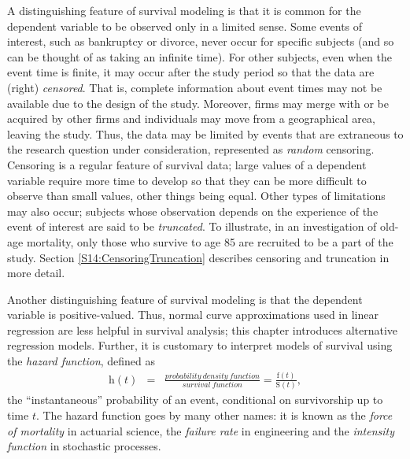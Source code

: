 
A distinguishing feature of survival modeling is that it is common
for the dependent variable to be observed only in a limited sense.
Some events of interest, such as bankruptcy or divorce, never occur
for specific subjects (and so can be thought of as taking an
infinite time). For other subjects, even when the event time is
finite, it may occur after the study period so that the data are
(right) \emph{censored}. That is, complete information about event
times may not be available due to the design of the study. Moreover,
firms may merge with or be acquired by other firms and individuals
may move from a geographical area, leaving the study. Thus, the data
may be limited by events that are extraneous to the research
question under consideration, represented as \emph{random}
censoring. Censoring is a regular feature of survival data; large
values of a dependent variable require more time to develop so that
they can be more difficult to observe than small values, other
things being equal. Other types of limitations may also occur;
subjects whose observation depends on the experience of the event of
interest are said to be \emph{truncated}. To illustrate, in an
investigation of old-age mortality, only those who survive to age 85
are recruited to be a part of the study. Section
\ref{S14:CensoringTruncation} describes censoring and truncation in
more detail.


Another distinguishing feature of survival modeling is that the
dependent variable is positive-valued. Thus, normal curve
approximations used in linear regression are less helpful in
survival analysis; this chapter introduces alternative regression
models. Further, it is customary to interpret models of survival
using the \emph{hazard function}, defined as
\begin{eqnarray*}
\mathrm{h}(t)&= &\frac{probability~density~function}
{survival~function} =\frac{\mathrm{f}(t)}{\mathrm{S}(t)},
\end{eqnarray*}
the ``instantaneous'' probability of an event, conditional on
survivorship up to time $t$. The hazard function goes by many other
names: it is known as the \emph{force of mortality} in actuarial
science, the \emph{failure rate} in engineering and the
\emph{intensity function} in stochastic processes.


